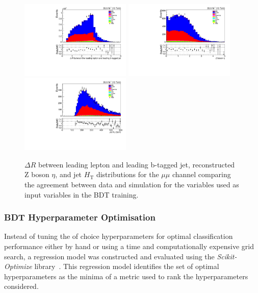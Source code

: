 \begin{figure}[!Htb]
\centering
\includegraphics[width=0.47\textwidth]{figs/background-estimation/plots/unblinded/prompt_mumu_ttbarInc/zLep1BjetDelR_NPL_mumu_wMass_mumu.pdf}
\includegraphics[width=0.47\textwidth]{figs/background-estimation/plots/unblinded/prompt_mumu_ttbarInc/zPairEta_NPL_mumu_wMass_mumu.pdf}
\\
\includegraphics[width=0.47\textwidth]{figs/background-estimation/plots/unblinded/prompt_mumu_ttbarInc/jetHt_NPL_mumu_wMass_mumu.pdf}
\caption{
$\Delta R$ between leading lepton and leading b-tagged jet, reconstructed Z boson $\eta$, and jet ${\ensuremath{H_{\mathrm{T}}}}$ distributions for the $\mu\mu$ channel comparing the agreement between data and simulation for the variables used as input variables in the BDT training.}
\label{fig:inputFeaturesDataSimAgreement5}
\end{figure}

\subsubsection*{BDT Hyperparameter Optimisation}
Instead of tuning the of choice hyperparameters for optimal classification performance either by hand or using a time and computationally expensive grid search, a regression model was constructed and evaluated using the \emph{Scikit-Optimize} library~\cite{scikit-optimise}.
This regression model identifies the set of optimal hyperparameters as the minima of a metric used to rank the hyperparameters considered.

